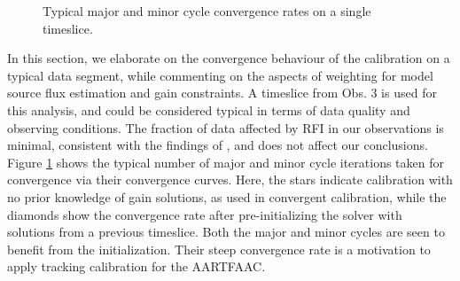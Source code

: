 \documentclass{aa}
\begin{document}
\begin{figure}[tbh]

\caption{\label{fig:Convergence-behaviour-of}Typical   major  and   minor  cycle
  convergence rates on  a single timeslice.}
\end{figure}

In this section, we elaborate on the convergence behaviour of the calibration on
a typical data  segment, while commenting on the aspects  of weighting for model
source flux estimation  and gain constraints.  A timeslice from  Obs.  3 is used
for this analysis, and could be  considered typical in terms of data quality and
observing conditions.  The fraction of  data affected by RFI in our observations
is minimal, consistent with  the findings of \citep{offringa2013lofar}, and does
not affect our conclusions.  Figure \ref{fig:Convergence-behaviour-of} shows the
typical number  of major  and minor cycle  iterations taken for  convergence via
their convergence  curves. Here,  the stars indicate  calibration with  no prior
knowledge  of gain  solutions,  as  used in  convergent  calibration, while  the
diamonds  show  the convergence  rate  after  pre-initializing  the solver  with
solutions from a  previous timeslice.  Both the major and  minor cycles are seen
to  benefit  from  the  initialization.  Their  steep  convergence  rate  is  a
motivation to apply tracking calibration for the AARTFAAC.
\end{document}
